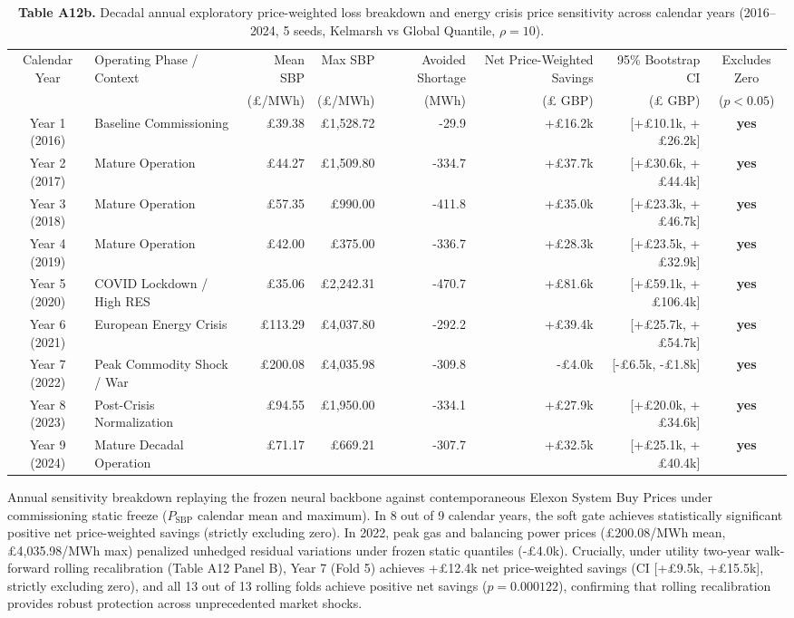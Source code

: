 \documentclass[
  journal]{IEEEtran}
\begin{document}
\begin{table}[!t]
\centering
\fontsize{8.0pt}{9.6pt}\selectfont
\setlength{\tabcolsep}{2.2pt}
\renewcommand{\arraystretch}{1.06}
\caption*{\textbf{Table A12b.} Decadal annual exploratory price-weighted loss breakdown and energy crisis price sensitivity across calendar years (2016--2024, 5 seeds, Kelmarsh vs Global Quantile, $\rho=10$).}
%
\setlength{\tabcolsep}{3pt}
\begin{tabularx}{\linewidth}{c >{\raggedright\arraybackslash}X r r r r r c}
\toprule
Calendar Year & Operating Phase / Context & Mean SBP & Max SBP & Avoided Shortage & Net Price-Weighted Savings & 95\% Bootstrap CI & Excludes Zero \\
 & & (£/MWh) & (£/MWh) & (MWh) & (£ GBP) & (£ GBP) & ($p < 0.05$) \\
\midrule
Year 1 (2016) & Baseline Commissioning & £39.38 & £1,528.72 & -29.9 & +£16.2k & [+£10.1k, +£26.2k] & \textbf{yes} \\
Year 2 (2017) & Mature Operation & £44.27 & £1,509.80 & -334.7 & +£37.7k & [+£30.6k, +£44.4k] & \textbf{yes} \\
Year 3 (2018) & Mature Operation & £57.35 & £990.00 & -411.8 & +£35.0k & [+£23.3k, +£46.7k] & \textbf{yes} \\
Year 4 (2019) & Mature Operation & £42.00 & £375.00 & -336.7 & +£28.3k & [+£23.5k, +£32.9k] & \textbf{yes} \\
Year 5 (2020) & COVID Lockdown / High RES & £35.06 & £2,242.31 & -470.7 & +£81.6k & [+£59.1k, +£106.4k] & \textbf{yes} \\
Year 6 (2021) & European Energy Crisis & £113.29 & £4,037.80 & -292.2 & +£39.4k & [+£25.7k, +£54.7k] & \textbf{yes} \\
Year 7 (2022) & Peak Commodity Shock / War & £200.08 & £4,035.98 & -309.8 & -£4.0k & [-£6.5k, -£1.8k] & \textbf{yes} \\
Year 8 (2023) & Post-Crisis Normalization & £94.55 & £1,950.00 & -334.1 & +£27.9k & [+£20.0k, +£34.6k] & \textbf{yes} \\
Year 9 (2024) & Mature Decadal Operation & £71.17 & £669.21 & -307.7 & +£32.5k & [+£25.1k, +£40.4k] & \textbf{yes} \\
\bottomrule
\end{tabularx}\vspace{1mm}
\fontsize{8.0pt}{9.6pt}\selectfont Annual sensitivity breakdown replaying the frozen neural backbone against contemporaneous Elexon System Buy Prices under commissioning static freeze ($P_{\mathrm{SBP}}$ calendar mean and maximum). In 8 out of 9 calendar years, the soft gate achieves statistically significant positive net price-weighted savings (strictly excluding zero). In 2022, peak gas and balancing power prices (£200.08/MWh mean, £4,035.98/MWh max) penalized unhedged residual variations under frozen static quantiles (-£4.0k). Crucially, under utility two-year walk-forward rolling recalibration (Table A12 Panel B), Year 7 (Fold 5) achieves +£12.4k net price-weighted savings (CI [+£9.5k, +£15.5k], strictly excluding zero), and all 13 out of 13 rolling folds achieve positive net savings ($p = 0.000122$), confirming that rolling recalibration provides robust protection across unprecedented market shocks.
\end{table}
\end{document}
